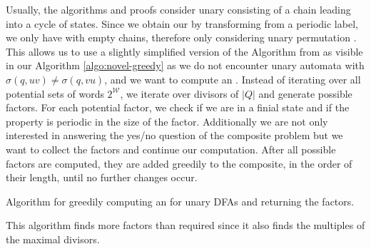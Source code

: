 Usually, the algorithms and proofs consider unary \DFAs consisting of a chain leading into a cycle of states.
Since we obtain our \DFAs by transforming from a periodic label, we only have \DFAs with empty chains, therefore only considering unary permutation \DFA.
This allows us to use a slightly simplified version of the Algorithm from \cite{DBLP:journals/corr/abs-2107-04683} as visible in our Algorithm \ref{algo:novel-greedy} as we do not encounter unary automata with $\sigma(q, uv) \not = \sigma(q, vu)$, and we want to compute an \orDecomp.
Instead of iterating over all potential sets of words $2^\mathcal{W}$, we iterate over divisors of $|Q|$ and generate possible factors.
For each potential factor, we check if we are in a finial state and if the property is periodic in the size of the factor.
Additionally we are not only interested in answering the yes/no question of the composite problem but we want to collect the factors and continue our computation.
After all possible factors are computed, they are added greedily to the composite, in the order of their length, until no further changes occur.
\begin{algorithm}[h]
	\DontPrintSemicolon
	
	
	\caption{Algorithm for greedily computing an \orDecomp for unary DFAs and returning the factors.}
	\label{algo:novel-greedy}
\end{algorithm}
This algorithm finds more factors than required since it also finds the multiples of the maximal divisors.
